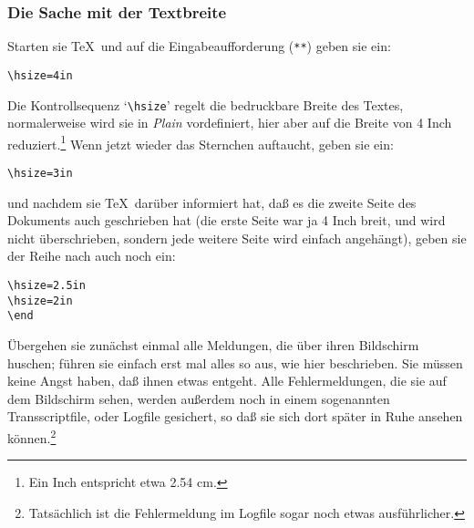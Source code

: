 \subsubsection{Die Sache mit der Textbreite}
Starten sie \TeX\ und auf die Eingabeaufforderung (\verb|**|) geben
sie ein:
\begin{verbatim}
\hsize=4in 
\end{verbatim}
Die 
Kontrollsequenz `\verb|\hsize|' regelt die bedruckbare Breite des
Textes, normalerweise wird sie in {\em Plain} vordefiniert, hier aber
auf die Breite von 4 Inch reduziert.\footnote{Ein Inch entspricht etwa
2.54 cm.} Wenn jetzt wieder das Sternchen auftaucht, geben sie ein:
\begin{verbatim}
\hsize=3in 
\end{verbatim}
und nachdem sie \TeX\ dar\"uber informiert hat, da\ss{} es die zweite
Seite
des Dokuments auch geschrieben hat (die erste Seite war ja 4 Inch
breit, und wird nicht \"uberschrieben, sondern jede weitere Seite wird
einfach angeh\"angt), geben sie der Reihe nach auch noch ein:
\begin{verbatim}
\hsize=2.5in 
\hsize=2in 
\end
\end{verbatim}

\"Ubergehen sie zun\"achst einmal alle Meldungen, die \"uber ihren
Bildschirm huschen; f\"uhren sie einfach erst mal alles so aus, wie hier
beschrieben. Sie m\"ussen keine Angst haben, da\ss{} ihnen etwas entgeht.
Alle Fehlermeldungen, die sie auf dem Bildschirm sehen, werden
au\ss{}erdem noch in einem sogenannten 
Transscriptfile, oder Logfile
gesichert, so da\ss{} sie sich dort sp\"ater in Ruhe ansehen
k\"onnen.\footnote{Tats\"achlich ist die Fehlermeldung im Logfile sogar
noch etwas ausf\"uhrlicher.}

